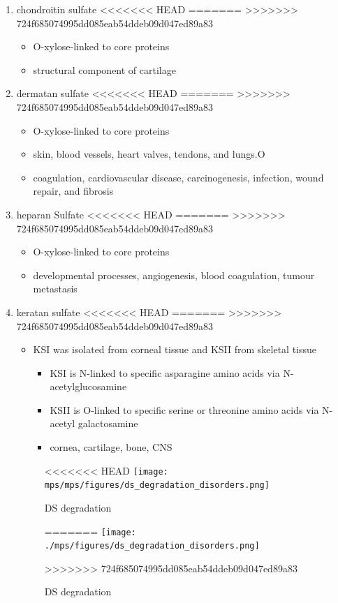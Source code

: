 \documentclass[fontsize=12pt]{scrartcl}
\begin{document}
\begin{enumerate}
\begin{enumerate}
\begin{enumerate}
\begin{enumerate}
\begin{table}[htbp]
\begin{enumerate}
\begin{enumerate}
\begin{enumerate}
\begin{enumerate}
\item chondroitin sulfate
<<<<<<< HEAD
\label{sec:org8d7fedc}
=======
\label{sec:orgee3c2e6}
>>>>>>> 724f685074995dd085eab54ddeb09d047ed89a83
\begin{itemize}
\item O-xylose-linked to core proteins
\item structural component of cartilage
\end{itemize}

\item dermatan sulfate
<<<<<<< HEAD
\label{sec:org5478b41}
=======
\label{sec:org2326b69}
>>>>>>> 724f685074995dd085eab54ddeb09d047ed89a83
\begin{itemize}
\item O-xylose-linked to core proteins
\item skin, blood vessels, heart valves, tendons, and lungs.O
\item coagulation, cardiovascular disease, carcinogenesis, infection, wound repair, and fibrosis
\end{itemize}

\item heparan Sulfate
<<<<<<< HEAD
\label{sec:orgca5ff3e}
=======
\label{sec:org06c89a5}
>>>>>>> 724f685074995dd085eab54ddeb09d047ed89a83
\begin{itemize}
\item O-xylose-linked to core proteins
\item developmental processes, angiogenesis, blood coagulation, tumour metastasis
\end{itemize}

\item keratan sulfate
<<<<<<< HEAD
\label{sec:org7ebe23b}
=======
\label{sec:orgf423dba}
>>>>>>> 724f685074995dd085eab54ddeb09d047ed89a83
\begin{itemize}
\item KSI was isolated from corneal tissue and KSII from skeletal tissue
\begin{itemize}
\item KSI is N-linked to specific asparagine amino acids via
N-acetylglucosamine
\item KSII is O-linked to specific serine or threonine amino acids via
N-acetyl galactosamine
\item cornea, cartilage, bone, CNS
\end{itemize}
\end{itemize}


\begin{figure}[htbp]
\centering
<<<<<<< HEAD
\texttt{[image: mps/mps/figures/ds\_degradation\_disorders.png]}
\caption[DS Degradation]{\label{fig:orgc5ca9c9}DS degradation}
=======
\texttt{[image: ./mps/figures/ds\_degradation\_disorders.png]}
\caption[DS Degradation]{\label{fig:org03bc4aa}
DS degradation}
>>>>>>> 724f685074995dd085eab54ddeb09d047ed89a83
\end{figure}


\end{enumerate}
\end{enumerate}
\end{enumerate}
\end{enumerate}
\end{table}
\end{enumerate}
\end{enumerate}
\end{enumerate}
\end{enumerate}
\end{document}
